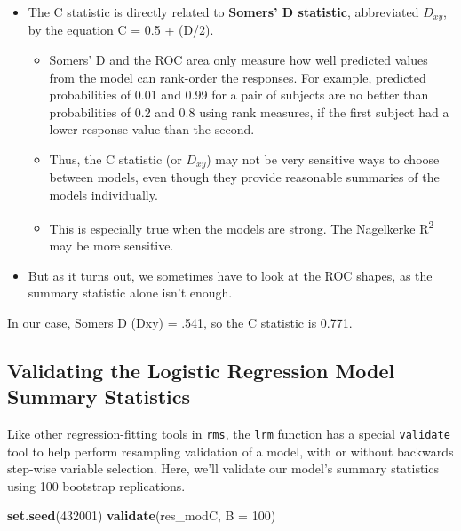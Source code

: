 \documentclass[]{book}
\newenvironment{Shaded}{\begin{snugshade}}{\end{snugshade}}
\newcommand{\KeywordTok}[1]{\textcolor[rgb]{0.13,0.29,0.53}{\textbf{#1}}}
\newcommand{\DataTypeTok}[1]{\textcolor[rgb]{0.13,0.29,0.53}{#1}}
\newcommand{\DecValTok}[1]{\textcolor[rgb]{0.00,0.00,0.81}{#1}}
\newcommand{\NormalTok}[1]{#1}
\providecommand{\tightlist}{%
  \setlength{\itemsep}{0pt}\setlength{\parskip}{0pt}}
\theoremstyle{definition}
\theoremstyle{definition}
\theoremstyle{definition}
\theoremstyle{remark}
\begin{document}
\begin{itemize}
\tightlist
\item
  The C statistic is directly related to \textbf{Somers' D statistic},
  abbreviated \(D_{xy}\), by the equation C = 0.5 + (D/2).

  \begin{itemize}
  \tightlist
  \item
    Somers' D and the ROC area only measure how well predicted values
    from the model can rank-order the responses. For example, predicted
    probabilities of 0.01 and 0.99 for a pair of subjects are no better
    than probabilities of 0.2 and 0.8 using rank measures, if the first
    subject had a lower response value than the second.
  \item
    Thus, the C statistic (or \(D_{xy}\)) may not be very sensitive ways
    to choose between models, even though they provide reasonable
    summaries of the models individually.
  \item
    This is especially true when the models are strong. The Nagelkerke
    R\textsuperscript{2} may be more sensitive.
  \end{itemize}
\item
  But as it turns out, we sometimes have to look at the ROC shapes, as
  the summary statistic alone isn't enough.
\end{itemize}

In our case, Somers D (Dxy) = .541, so the C statistic is 0.771.

\subsection{Validating the Logistic Regression Model Summary
Statistics}\label{validating-the-logistic-regression-model-summary-statistics}

Like other regression-fitting tools in \texttt{rms}, the \texttt{lrm}
function has a special \texttt{validate} tool to help perform resampling
validation of a model, with or without backwards step-wise variable
selection. Here, we'll validate our model's summary statistics using 100
bootstrap replications.

\begin{Shaded}
\begin{Highlighting}[]
\KeywordTok{set.seed}\NormalTok{(}\DecValTok{432001}\NormalTok{) }
\KeywordTok{validate}\NormalTok{(res_modC, }\DataTypeTok{B =} \DecValTok{100}\NormalTok{)}
\end{Highlighting}
\end{Shaded}
\end{document}
